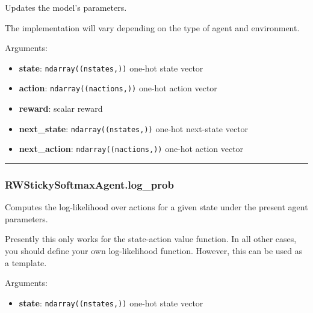 \begin{Shaded}
\begin{Highlighting}[]
\end{Highlighting}
\end{Shaded}

Updates the model's parameters.

The implementation will vary depending on the type of agent and
environment.

Arguments:

\begin{itemize}
\tightlist
\item
  \textbf{state}: \texttt{ndarray((nstates,))} one-hot state vector
\item
  \textbf{action}: \texttt{ndarray((nactions,))} one-hot action vector
\item
  \textbf{reward}: scalar reward
\item
  \textbf{next\_state}: \texttt{ndarray((nstates,))} one-hot next-state
  vector
\item
  \textbf{next\_action}: \texttt{ndarray((nactions,))} one-hot action
  vector
\end{itemize}

\begin{center}\rule{0.5\linewidth}{\linethickness}\end{center}

\subsubsection{RWStickySoftmaxAgent.log\_prob}\label{rwstickysoftmaxagent.log_prob}

\begin{Shaded}
\begin{Highlighting}[]
\end{Highlighting}
\end{Shaded}

Computes the log-likelihood over actions for a given state under the
present agent parameters.

Presently this only works for the state-action value function. In all
other cases, you should define your own log-likelihood function.
However, this can be used as a template.

Arguments:

\begin{itemize}
\tightlist
\item
  \textbf{state}: \texttt{ndarray((nstates,))} one-hot state vector
\end{itemize}

